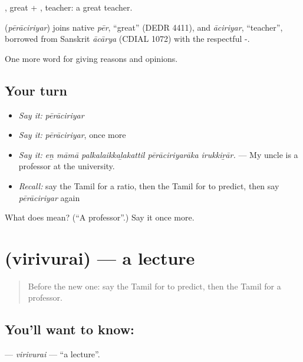 , great + , teacher: a great teacher.

\begin{cousinweb}
\textbf{} (\emph{pērāciriyar}) joins native \emph{pēr}, \textquotedblleft{}great\textquotedblright{} (DEDR 4411), and \emph{āciriyar}, \textquotedblleft{}teacher\textquotedblright{}, borrowed from Sanskrit \emph{ācārya} (CDIAL 1072) with the respectful -.
\end{cousinweb}

\begin{grammarlens}[title={What you've built}]
One more word for giving reasons and opinions.
\end{grammarlens}

\subsection*{Your turn}
\begin{itemize}
\raggedright
  \item \emph{Say it:} \emph{pērāciriyar}
  \item \emph{Say it:} \emph{pērāciriyar}, once more
  \item \emph{Say it:} \emph{eṉ māmā palkalaikkaḻakattil pērāciriyarāka irukkiṟār.} — My uncle is a professor at the university.
  \item \emph{Recall:} say the Tamil for a ratio, then the Tamil for to predict, then say \emph{pērāciriyar} again
\end{itemize}

\begin{tcolorbox}[breakable,colback=teal!4,colframe=teal!35!black,title={Before you move on}]
What does  mean? (\textquotedblleft{}A professor\textquotedblright{}.) Say it once more.
\end{tcolorbox}
\section[\texorpdfstring{\ta{விரிவுரை} (virivurai)}{விரிவுரை (virivurai)}]{ (virivurai) — a lecture}

\label{lesson:TA-C364-virivurai}



\begin{quote}
Before the new one: say the Tamil for to predict, then the Tamil for a professor.
\end{quote}

\subsection*{You'll want to know: }
\textbf{} — \emph{virivurai} — \textquotedblleft{}a lecture\textquotedblright{}.

